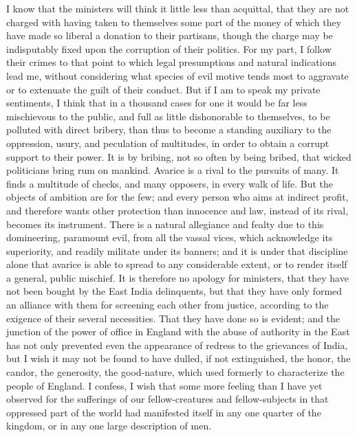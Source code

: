 I know that the ministers will think it little less than acquittal, that they are not charged with having taken to themselves some part of the money of which they have made so liberal a donation to their partisans, though the charge may be indisputably fixed upon the corruption of their politics. For my part, I follow their crimes to that point to which legal presumptions and natural indications lead me, without considering what species of evil motive tends most to aggravate or to extenuate the guilt of their conduct. But if I am to speak my private sentiments, I think that in a thousand cases for one it would be far less mischievous to the public, and full as little dishonorable to themselves, to be polluted with direct bribery, than thus to become a standing auxiliary to the oppression, usury, and peculation of multitudes, in order to obtain a corrupt support to their power. It is by bribing, not so often by being bribed, that wicked politicians bring rum on mankind. Avarice is a rival to the pursuits of many. It finds a multitude of checks, and many opposers, in every walk of life. But the objects of ambition are for the few; and every person who aims at indirect profit, and therefore wants other protection than innocence and law, instead of its rival, becomes its instrument. There is a natural allegiance and fealty due to this domineering, paramount evil, from all the vassal vices, which acknowledge its superiority, and readily militate under its banners; and it is under that discipline alone that avarice is able to spread to any considerable extent, or to render itself a general, public mischief. It is therefore no apology for ministers, that they have not been bought by the East India delinquents, but that they have only formed an alliance with them for screening each other from justice, according to the exigence of their several necessities. That they have done so is evident; and the junction of the power of office in England with the abuse of authority in the East has not only prevented even the appearance of redress to the grievances of India, but I wish it may not be found to have dulled, if not extinguished, the honor, the candor, the generosity, the good-nature, which used formerly to characterize the people of England. I confess, I wish that some more feeling than I have yet observed for the sufferings of our fellow-creatures and fellow-subjects in that oppressed part of the world had manifested itself in any one quarter of the kingdom, or in any one large description of men.

